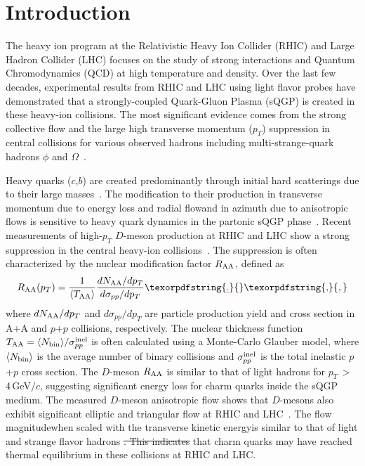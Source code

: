 \documentclass[%
 reprint,	
showpacs,
 amsmath,amssymb,
 aps,
 prc,
]{revtex4-1}
\providecommand{\DIFaddtex}[1]{{\protect\color{blue}\uwave{#1}}} %
\providecommand{\DIFdeltex}[1]{{\protect\color{red}\sout{#1}}}                      %
\providecommand{\DIFaddbegin}{} %
\providecommand{\DIFaddend}{} %
\providecommand{\DIFdelbegin}{} %
\providecommand{\DIFdelend}{} %
\providecommand{\DIFadd}[1]{\texorpdfstring{\DIFaddtex{#1}}{#1}} %
\providecommand{\DIFdel}[1]{\texorpdfstring{\DIFdeltex{#1}}{}} %
\begin{document}
\section{Introduction}
\label{introduction}

The heavy ion program at the Relativistic Heavy Ion Collider (RHIC) and Large Hadron Collider (LHC) focuses on the study of strong interactions and Quantum Chromodynamics (QCD) at high temperature and density. Over the last few decades, experimental results from RHIC and LHC using light flavor probes have demonstrated that a strongly-coupled Quark-Gluon Plasma (sQGP) is created in these heavy-ion collisions. The most significant evidence comes from the strong collective flow and the large high transverse momentum ($p_{T}$) suppression in central collisions for various observed hadrons including multi-strange-quark hadrons $\phi$ and $\Omega$~\cite{StarWhitePaper,PhenixWhitePaper,LhcSummary,Adamczyk:2015ukd,Abelev:2014pua}.

Heavy quarks ($c$,$b$) are created predominantly through initial hard scatterings due to their large masses~\cite{Ziwei_Lin,Cacciari}. The modification to their production in transverse momentum due to energy loss and radial flow\DIFaddbegin \DIFadd{, }\DIFaddend and in azimuth due to anisotropic flows is sensitive to heavy quark dynamics in the partonic sQGP phase~\cite{Moore}. Recent measurements of high-$p_{T}$ $D$-meson production at RHIC and LHC show a strong suppression in the central heavy-ion collisions~\cite{Alice_D_RAA_1,Alice_D_RAA_2,CMS_D_RAA_5TeV,Star_D_RAA}. The suppression is often characterized by the nuclear modification factor $R_{\rm AA}$, defined as
\begin{equation}
  R_{\rm AA}(p_T) = \frac{1}{\langle T_{\rm AA}\rangle} \frac{dN_{\rm AA}/dp_{T}}{d\sigma_{pp}/dp_{T}}\DIFdelbegin \DIFdel{.
}\DIFdelend \DIFaddbegin \DIFadd{,
}\DIFaddend \label{equ:equation0}
\end{equation}
where $dN_{\rm AA}/dp_T$ and $d\sigma_{pp}/dp_T$ are particle production yield and cross section in A+A and $p$+$p$ collisions, respectively. The nuclear thickness function $T_{\rm AA}=\langle N_{\rm bin}\rangle/\sigma_{pp}^{\rm inel}$ is often calculated using a Monte-Carlo Glauber model, where $\langle N_{\rm bin}\rangle$ is the average number of binary collisions and $\sigma_{pp}^{\rm inel}$ is the total inelastic $p$+$p$ cross section.
The $D$-meson $R_{\rm AA}$ is similar to that of light hadrons for $p_{T}$$\,>$\,4\,GeV/$c$, suggesting significant energy loss for charm quarks inside the sQGP medium. The measured $D$-meson anisotropic flow shows that $D$-mesons also exhibit significant elliptic and triangular flow at RHIC and LHC~\cite{Alice_D_v2_276TeV_PRL,Alice_D_v2_276TeV_PRC,CMS_D_vn_5TeV,Star_D_v2}. The flow magnitude\DIFaddbegin \DIFadd{, }\DIFaddend when scaled with the transverse kinetic energy\DIFaddbegin \DIFadd{, }\DIFaddend is similar to that of light and strange flavor hadrons \DIFdelbegin \DIFdel{. This indicates }\DIFdelend \DIFaddbegin \DIFadd{indicating }\DIFaddend that charm quarks may have reached thermal equilibrium in these collisions at RHIC and LHC.
\end{document}
